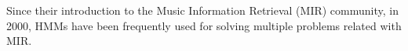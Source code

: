 
Since their introduction to the Music Information Retrieval (MIR) community, in 2000, HMMs have been frequently used for solving multiple problems related with MIR.


